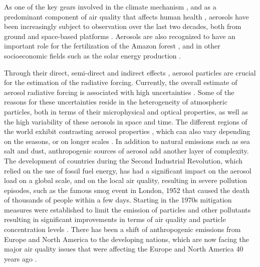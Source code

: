 \documentclass[journal abbreviation, manuscript]{copernicus}
\begin{document}


\introduction  %
As one of the key gears involved in the climate mechanism \citep{poschl2005atmospheric}, and as a predominant component of air quality that affects human health \citep{burnett2014integrated}, aerosols have been increasingly subject to observation over the last two decades, both from ground and space-based platforms \citep{holben2001emerging,kaufman2002satellite}.  Aerosols are also recognized to have an important role for the fertilization of the Amazon forest \citep{yu2015fertilizing}, and in other socioeconomic fields such as the solar energy production \citep{Li11867,labordena2018blue}.

Through their direct, semi-direct and indirect effects \citep{rap2013natural,johnson2004semi,lohmann2005global}, aerosol particles are crucial for the estimation of the radiative forcing. Currently, the overall estimate of aerosol radiative forcing is associated with high uncertainties \citep{haywood2000estimates, stocker2014climate}. Some of the reasons for these uncertainties reside in the heterogeneity of atmospheric particles, both in terms of their microphysical and optical properties, as well as the high variability of these aerosols in space and time. The different regions of the world exhibit contrasting aerosol properties \citep{holben2001emerging}, which can also vary depending on the seasons, or on longer scales \citep{streets2009anthropogenic}. In addition to natural emissions such as sea salt and dust, anthropogenic sources of aerosol add another layer of complexity. The development of countries during the Second Industrial Revolution, which relied on the use of fossil fuel energy, has had a significant impact on the aerosol load on a global scale, and on the local air quality, resulting in severe pollution episodes, such as the famous smog event in London, 1952 \citep{bell2004retrospective} that caused the death of thousands of people within a few days.
Starting in the 1970s mitigation measures were established to limit the emission of particles and other pollutants \citep{bryner1995blue,turnock2016impact} resulting in significant improvements in terms of air quality and particle concentration levels \citep{likens2001long}. There has been a shift of anthropogenic emissions from Europe and North America to the developing nations, which are now facing the major air quality issues that were affecting the Europe and North America 40 years ago \citep{streets2008aerosol,ramachandran2012aerosol}.
\end{document}
